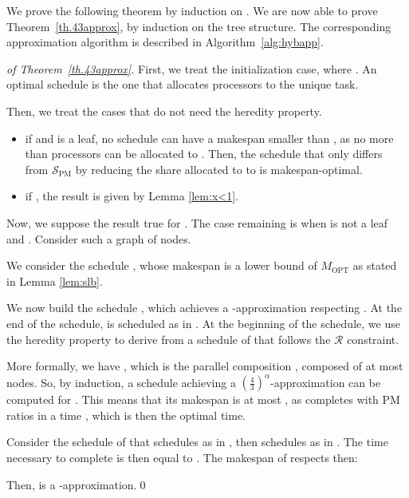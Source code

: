 \documentclass{llncs}
\newcommand{\spm}{\ensuremath{\mathcal{S}_{\mathrm{PM}}}\xspace}
\newcommand{\mopt}{\ensuremath{{M}_{\mathrm{OPT}}}\xspace}
\newcommand{\R}{\ensuremath{\mathcal{R}}\xspace}
\newcommand{\frtrd}{\ensuremath{\left(\frac{4}{3}\right)^\alpha}}
\begin{document}
We prove the following theorem by induction on .  We are now able
to prove Theorem~\ref{th.43approx}, by induction on the tree
structure. The corresponding approximation algorithm is described in
Algorithm~\ref{alg:hybapp}.

 
\begin{proof}[of Theorem~\ref{th.43approx}]
First, we treat the initialization case, where . An optimal schedule is the one that allocates  processors to the unique task.

Then, we treat the cases that do not need the heredity property.
\begin{itemize}
\item if  and  is a leaf, no schedule can have a makespan smaller than , as no more than  processors can be allocated to . Then, the schedule that only differs from \spm by reducing the share allocated to  to  is makespan-optimal.
\item if , the result is given by Lemma \ref{lem:x<1}. 
\end{itemize}

Now, we suppose the result true for . The case remaining is when  is not a leaf and . Consider such a graph  of  nodes.





We consider the schedule , whose makespan  is a lower bound of \mopt as stated in Lemma \ref{lem:slb}.  




We now build the schedule , which achieves a -approximation respecting .
At the end of the schedule,  is scheduled as in . At the beginning of the schedule, we use the heredity property to derive from  a schedule of  that follows the \R constraint.


More formally, we have , which is the parallel composition , composed of at most  nodes. So, by induction, a schedule  achieving a \frtrd-approximation can be computed for . This means that its makespan  is at most , as  completes  with PM ratios in a time , which is then the optimal time.

Consider the schedule  of  that schedules  as in , then schedules  as in . The time necessary to complete  is then equal to .
The makespan  of  respects then:
 
 
  Then,  is a -approximation.\qed
\end{proof}
\end{document}
